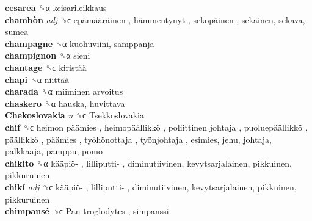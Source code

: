 \textbf{cesarea} ␝α  keisarileikkaus  \\
\textbf{chambòn} \emph{adj}  ␝ϲ   epämääräinen ,  hämmentynyt ,  sekopäinen , sekainen, sekava, sumea  \\
\textbf{champagne} ␝α  kuohuviini, samppanja  \\
\textbf{champignon} ␝α  sieni  \\
\textbf{chantage} ␝ϲ   kiristää   \\
\textbf{chapi} ␝α   niittää   \\
\textbf{charada} ␝α   miiminen arvoitus   \\
\textbf{chaskero} ␝α  hauska, huvittava  \\
\textbf{Chekoslovakia} \emph{n}  ␝ϲ   Tsekkoslovakia   \\
\textbf{chif} ␝ϲ   heimon päämies ,  heimopäällikkö ,  poliittinen johtaja ,  puoluepäällikkö ,  päällikkö ,  päämies ,  työhönottaja ,  työnjohtaja , esimies, jehu, johtaja, palkkaaja, pamppu, pomo  \\
\textbf{chikito} ␝α   kääpiö- ,  lilliputti- , diminutiivinen, kevytsarjalainen, pikkuinen, pikkuruinen  \\
\textbf{chikí} \emph{adj}  ␝ϲ   kääpiö- ,  lilliputti- , diminutiivinen, kevytsarjalainen, pikkuinen, pikkuruinen  \\
\textbf{chimpansé} ␝ϲ   Pan troglodytes , simpanssi  \\
